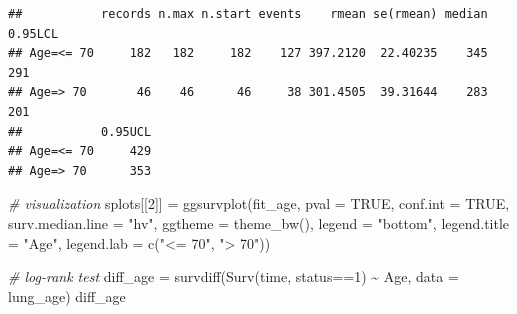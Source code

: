 \documentclass[
]{article}
\newenvironment{Shaded}{\begin{snugshade}}{\end{snugshade}}
\newcommand{\AttributeTok}[1]{\textcolor[rgb]{0.77,0.63,0.00}{#1}}
\newcommand{\CommentTok}[1]{\textcolor[rgb]{0.56,0.35,0.01}{\textit{#1}}}
\newcommand{\ConstantTok}[1]{\textcolor[rgb]{0.00,0.00,0.00}{#1}}
\newcommand{\DecValTok}[1]{\textcolor[rgb]{0.00,0.00,0.81}{#1}}
\newcommand{\FunctionTok}[1]{\textcolor[rgb]{0.00,0.00,0.00}{#1}}
\newcommand{\NormalTok}[1]{#1}
\newcommand{\OtherTok}[1]{\textcolor[rgb]{0.56,0.35,0.01}{#1}}
\newcommand{\SpecialCharTok}[1]{\textcolor[rgb]{0.00,0.00,0.00}{#1}}
\newcommand{\StringTok}[1]{\textcolor[rgb]{0.31,0.60,0.02}{#1}}
\begin{document}
\begin{Shaded}
\end{Shaded}

\begin{verbatim}
##           records n.max n.start events    rmean se(rmean) median 0.95LCL
## Age=<= 70     182   182     182    127 397.2120  22.40235    345     291
## Age=> 70       46    46      46     38 301.4505  39.31644    283     201
##           0.95UCL
## Age=<= 70     429
## Age=> 70      353
\end{verbatim}

\begin{Shaded}
\begin{Highlighting}[]
\CommentTok{\# visualization}
\NormalTok{splots[[}\DecValTok{2}\NormalTok{]] }\OtherTok{=} \FunctionTok{ggsurvplot}\NormalTok{(fit\_age,}
                         \AttributeTok{pval =} \ConstantTok{TRUE}\NormalTok{, }\AttributeTok{conf.int =} \ConstantTok{TRUE}\NormalTok{,}
                         \AttributeTok{surv.median.line =} \StringTok{"hv"}\NormalTok{, }
                         \AttributeTok{ggtheme =} \FunctionTok{theme\_bw}\NormalTok{(), }
                         \AttributeTok{legend =} \StringTok{"bottom"}\NormalTok{, }
                         \AttributeTok{legend.title =} \StringTok{"Age"}\NormalTok{,}
                         \AttributeTok{legend.lab =} \FunctionTok{c}\NormalTok{(}\StringTok{"\textless{}= 70"}\NormalTok{, }\StringTok{"\textgreater{} 70"}\NormalTok{))}

\CommentTok{\# log{-}rank test}
\NormalTok{diff\_age }\OtherTok{=} \FunctionTok{survdiff}\NormalTok{(}\FunctionTok{Surv}\NormalTok{(time, status}\SpecialCharTok{==}\DecValTok{1}\NormalTok{) }\SpecialCharTok{\textasciitilde{}}\NormalTok{ Age, }\AttributeTok{data =}\NormalTok{ lung\_age) }
\NormalTok{diff\_age}
\end{Highlighting}
\end{Shaded}
\end{document}
